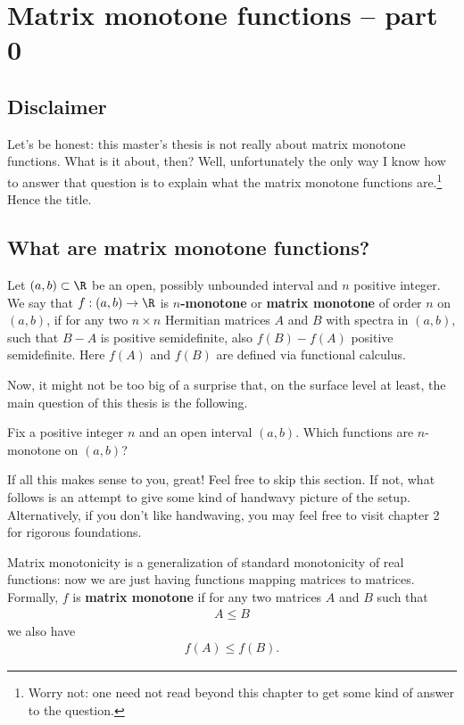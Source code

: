 \chapter{Matrix monotone functions -- part 0}

\section{Disclaimer}

Let's be honest: this master's thesis is not really about matrix monotone functions. What is it about, then? Well, unfortunately the only way I know how to answer that question is to explain what the matrix monotone functions are.\footnote{Worry not: one need not read beyond this chapter to get some kind of answer to the question.} Hence the title.

\section{What are matrix monotone functions?}

\begin{maar}\label{main_def}
	Let $(a,b) \subset \R$ be an open, possibly unbounded interval and $n$ positive integer. We say that $f : (a, b) \to \R$ is \textbf{$n$-monotone} or \textbf{matrix monotone} of order \textbf{$n$} on $(a, b)$, if for any two $n \times n$ Hermitian matrices $A$ and $B$ with spectra in $(a, b)$, such that $B - A$ is positive semidefinite, also $f(B) - f(A)$ positive semidefinite. Here $f(A)$ and $f(B)$ are defined via functional calculus.
\end{maar}

Now, it might not be too big of a surprise that, on the surface level at least, the main question of this thesis is the following.

\begin{quest}\label{question_1}
	Fix a positive integer $n$ and an open interval $(a, b)$. Which functions are $n$-monotone on $(a, b)$?
\end{quest}

If all this makes sense to you, great! Feel free to skip this section. If not, what follows is an attempt to give some kind of handwavy picture of the setup. Alternatively, if you don't like handwaving, you may feel free to visit chapter 2 for rigorous foundations.

Matrix monotonicity is a generalization of standard monotonicity of real functions: now we are just having functions mapping matrices to matrices. Formally, $f$ is \textbf{matrix monotone} if for any two matrices $A$ and $B$ such that
\begin{align*}
	A \leq B
\end{align*}
we also have
\begin{align*}
	f(A) \leq f(B).
\end{align*}

